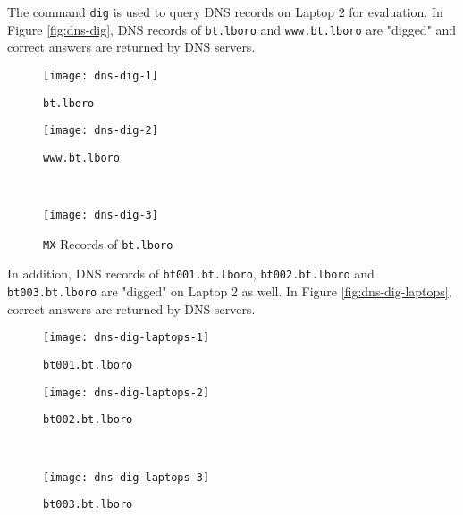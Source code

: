 The command \texttt{dig} is used to query DNS records on Laptop 2 for evaluation. In Figure \ref{fig:dns-dig}, DNS records of \texttt{bt.lboro} and \texttt{www.bt.lboro} are "digged" and correct answers are returned by DNS servers.

\begin{figure*}[ht!]
    \centering
    \begin{subfigure}[b]{0.67\textwidth}
        \centering
        \texttt{[image: dns-dig-1]}
        \caption{\texttt{bt.lboro}}
    \end{subfigure}
    \hfill
    \begin{minipage}[b]{0.3\textwidth}
	    \begin{subfigure}[b]{\linewidth}
	        \centering
	        \texttt{[image: dns-dig-2]}
	        \caption{\texttt{www.bt.lboro}}
	    \end{subfigure}
	    \\
	    \begin{subfigure}[b]{\linewidth}
	        \centering
	        \texttt{[image: dns-dig-3]}
	        \caption{\texttt{MX} Records of \texttt{bt.lboro}}
	    \end{subfigure}
	\end{minipage}
    \caption{Querying DNS Records for \texttt{bt.lboro} and \texttt{www.bt.lboro} on Laptop 2.}
    \label{fig:dns-dig}
\end{figure*}

In addition, DNS records of \texttt{bt001.bt.lboro}, \texttt{bt002.bt.lboro} and \texttt{bt003.bt.lboro} are "digged" on Laptop 2 as well. In Figure \ref{fig:dns-dig-laptops}, correct answers are returned by DNS servers.


\begin{figure*}[ht!]
    \centering
    \begin{subfigure}[b]{0.67\textwidth}
        \centering
        \texttt{[image: dns-dig-laptops-1]}
        \caption{\texttt{bt001.bt.lboro}}
    \end{subfigure}
    \hfill
    \begin{minipage}[b]{0.3\textwidth}
	    \begin{subfigure}[b]{\linewidth}
	        \centering
	        \texttt{[image: dns-dig-laptops-2]}
	        \caption{\texttt{bt002.bt.lboro}}
	    \end{subfigure}
	    \\
	    \begin{subfigure}[b]{\linewidth}
	        \centering
	        \texttt{[image: dns-dig-laptops-3]}
	        \caption{\texttt{bt003.bt.lboro}}
	    \end{subfigure}
	\end{minipage}
    \caption{Querying DNS Records for sub-domains of \texttt{bt.lboro} on Laptop 2.}
    \label{fig:dns-dig-laptops}
\end{figure*}



